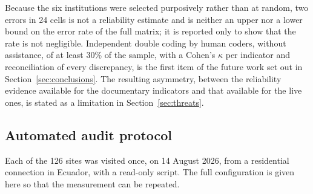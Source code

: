 \documentclass[]{interact}
\begin{document}
Because the six institutions were selected purposively rather than at random, two errors in 24 cells is not a reliability estimate and is neither an upper nor a lower bound on the error rate of the full matrix; it is reported only to show that the rate is not negligible. Independent double coding by human coders, without assistance, of at least 30\% of the sample, with a Cohen's $\kappa$ per indicator and reconciliation of every discrepancy, is the first item of the future work set out in Section~\ref{sec:conclusions}. The resulting asymmetry, between the reliability evidence available for the documentary indicators and that available for the live ones, is stated as a limitation in Section~\ref{sec:threats}.

\subsection{Automated audit protocol}\label{sec:methods-audit}

Each of the 126 sites was visited once, on 14 August 2026, from a residential connection in Ecuador, with a read-only script. The full configuration is given here so that the measurement can be repeated.
\end{document}
